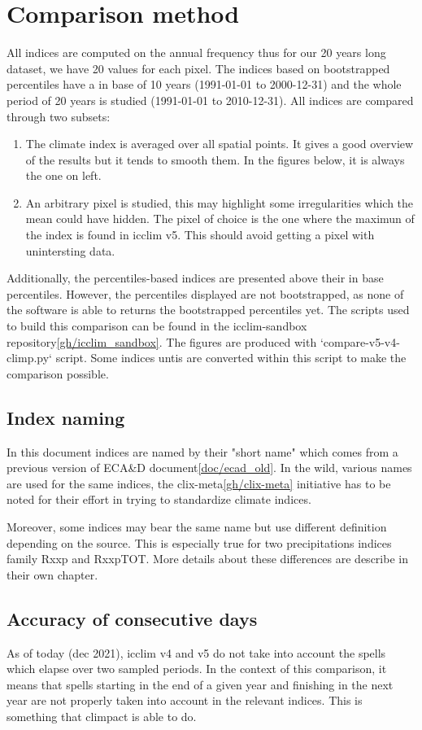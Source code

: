 \documentclass[a4paper,11pt]{article}
\begin{document}
\section{Comparison method}
    All indices are computed on the annual frequency thus for our 20 years long dataset, we have 20 values for each pixel.
    The indices based on bootstrapped percentiles have a in base of 10 years (1991-01-01 to 2000-12-31) and the whole period of 20 years is studied (1991-01-01 to 2010-12-31).
    All indices are compared through two subsets: 
    \begin{enumerate}
        \item The climate index is averaged over all spatial points. 
        It gives a good overview of the results but it tends to smooth them. In the figures below, it is always the one on left.
        \item An arbitrary pixel is studied, this may highlight some irregularities which the mean could have hidden. The pixel of choice is the one where the maximun of the index is found in icclim v5. This should avoid getting a pixel with unintersting data.
    \end{enumerate}
    Additionally, the percentiles-based indices are presented above their in base percentiles. However, the percentiles displayed are not bootstrapped, as none of the software is able to returns the bootstrapped percentiles yet.
    The scripts used to build this comparison can be found in the icclim-sandbox repository\ref{gh/icclim_sandbox}.
    The figures are produced with `compare-v5-v4-climp.py` script.
    Some indices untis are converted within this script to make the comparison possible.

\subsection{Index naming}
    In this document indices are named by their "short name" which comes from a previous version of ECA\&D document\ref{doc/ecad_old}.
    In the wild, various names are used for the same indices, the clix-meta\ref{gh/clix-meta} initiative has to be noted for their effort in trying to standardize climate indices.

    Moreover, some indices may bear the same name but use different definition depending on the source. This is especially true for two precipitations indices family Rxxp and RxxpTOT.
    More details about these differences are describe in their own chapter.
\subsection{Accuracy of consecutive days}
    As of today (dec 2021), icclim v4 and v5 do not take into account the spells which elapse over two sampled periods. In the context of this comparison, it means that spells starting in the end of a given year and finishing in the next year are not properly taken into account in the relevant indices.
    This is something that climpact is able to do.
\end{document}
